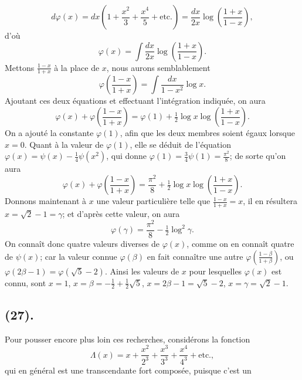 \documentclass{article}
\begin{document}
\[ d\varphi(x)=dx\left(1+\frac{x^{2}}{3}+\frac{x^{4}}{5}+\text{etc.}\right)=\frac{dx}{2x}\log\left(\frac{1+x}{1-x}\right), \]
d'où
\[ \varphi(x)=\int\frac{dx}{2x}\log\left(\frac{1+x}{1-x}\right). \]
Mettons $\frac{1-x}{1+x}$ à la place de $x$, nous aurons semblablement
\[ \varphi\left(\frac{1-x}{1+x}\right)=\int\frac{dx}{1-x^{2}}\log x. \]
Ajoutant ces deux équations et effectuant l'intégration indiquée, on aura
\[ \varphi(x)+\varphi\left(\frac{1-x}{1+x}\right)=\varphi(1)+\tfrac{1}{2}\log x\log\left(\frac{1+x}{1-x}\right). \]
On a ajouté la constante $\varphi(1)$, afin que les deux membres soient égaux lorsque $x=0$. Quant à la valeur de $\varphi(1)$, elle se déduit de l'équation $\varphi(x)=\psi(x)-\frac{1}{4}\psi(x^{2})$, qui donne $\varphi(1)=\frac{3}{4}\psi(1)=\frac{\pi^{2}}{8}$; de sorte qu'on aura
\[ \varphi(x)+\varphi\left(\frac{1-x}{1+x}\right)=\frac{\pi^{2}}{8}+\tfrac{1}{2}\log x\log\left(\frac{1+x}{1-x}\right). \]
Donnons maintenant à $x$ une valeur particulière telle que $\frac{1-x}{1+x}=x$, il en résultera $x=\sqrt{2}-1=\gamma$; et d'après cette valeur, on aura
\[ \varphi(\gamma)=\frac{\pi^{2}}{8}-\tfrac{1}{2}\log^{2}\gamma. \]
On connaît donc quatre valeurs diverses de $\varphi(x)$, comme on en connaît quatre de $\psi(x)$; car la valeur connue $\varphi(\beta)$ en fait connaître une autre $\varphi\left(\frac{1-\beta}{1+\beta}\right)$, ou $\varphi(2\beta-1)=\varphi(\sqrt{5}-2)$. Ainsi les valeurs de $x$ pour lesquelles $\varphi(x)$ est connu, sont $x=1$, $x=\beta=-\frac{1}{2}+\frac{1}{2}\sqrt{5}$, $x=2\beta-1=\sqrt{5}-2$, $x=\gamma=\sqrt{2}-1$.

\subsection*{(27).}

Pour pousser encore plus loin ces recherches, considérons la fonction
\[ \Lambda(x)=x+\frac{x^{2}}{2^{3}}+\frac{x^{3}}{3^{3}}+\frac{x^{4}}{4^{3}}+\text{etc.}, \]
qui en général est une transcendante fort composée, puisque c'est un
\end{document}
